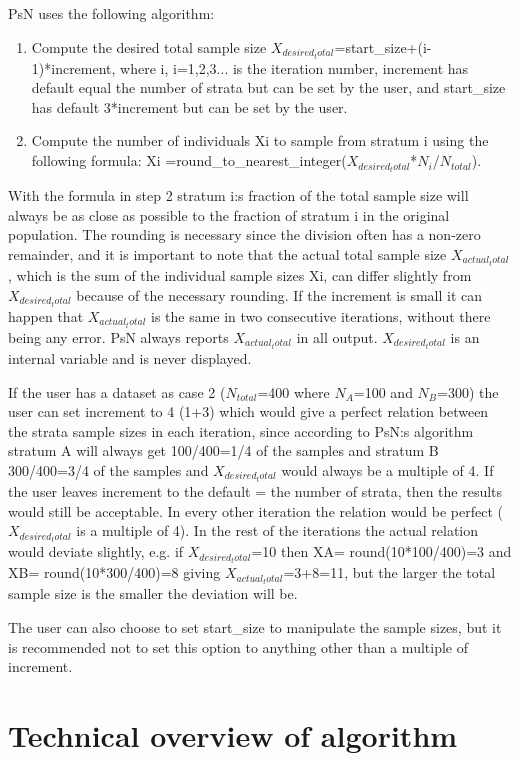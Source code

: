 PsN uses the following algorithm:
\begin{enumerate}
	\item Compute the desired total sample size $X_{desired_total}$=start\_size+(i-1)*increment, where i, i=1,2,3... 	is the iteration number, increment has default equal the number of strata but can be set by the 	user, and start\_size has default 3*increment but can be set by the user.
	\item Compute the number of individuals Xi to sample from stratum i using the following formula: 	Xi =round\_to\_nearest\_integer($X_{desired_total}$*$N_i$/$N_{total}$). 
\end{enumerate}
With the formula in step 2 stratum i:s fraction of the total sample size will always be as close as possible to the fraction of stratum i in the original population. The rounding is necessary since the division often has a non-zero remainder, and it is important to note that the actual total sample size $X_{actual_total}$, which is the sum of the individual sample sizes Xi, can differ slightly from $X_{desired_total}$ because of the necessary rounding. If the increment is small it can happen that $X_{actual_total}$ is the same in two consecutive iterations, without there being any error. PsN always reports $X_{actual_total}$ in all output. $X_{desired_total}$ is an internal variable and is never displayed.

If the user has a dataset as case 2 ($N_{total}$=400 where $N_A$=100 and $N_B$=300) the user can set increment to 4 (1+3) which would give a perfect relation between the strata sample sizes in each iteration, since according to PsN:s algorithm stratum A will always get 100/400=1/4 of the samples and stratum B 300/400=3/4 of the samples and $X_{desired_total}$ would always be a multiple of 4. If the user leaves increment to the default = the number of strata, then the results would still be acceptable. In every other iteration the relation would be perfect ( $X_{desired_total}$ is a multiple of 4). In the rest of the iterations the actual relation would deviate slightly, e.g. if $X_{desired_total}$=10 then XA= round(10*100/400)=3 and XB= round(10*300/400)=8 giving $X_{actual_total}$=3+8=11, but the larger the total sample size is the smaller the deviation will be. 

The user can also choose to set start\_size to manipulate the sample sizes, but it is recommended not to set this option to anything other than a multiple of increment.

\section{Technical overview of algorithm}

